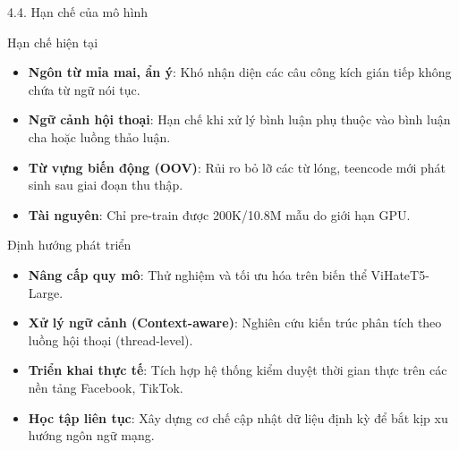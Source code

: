 \documentclass[11pt, aspectratio=169]{beamer}
\begin{document}
\begin{frame}[shrink=5]{4.4. Hạn chế của mô hình}
\scriptsize

\begin{block}{Hạn chế hiện tại}
  \begin{itemize}
    \item \textbf{Ngôn từ mỉa mai, ẩn ý}: Khó nhận diện các câu công kích gián tiếp không chứa từ ngữ nói tục.
    \item \textbf{Ngữ cảnh hội thoại}: Hạn chế khi xử lý bình luận phụ thuộc vào bình luận cha hoặc luồng thảo luận.
    \item \textbf{Từ vựng biến động (OOV)}: Rủi ro bỏ lỡ các từ lóng, teencode mới phát sinh sau giai đoạn thu thập.
    \item \textbf{Tài nguyên}: Chỉ pre-train được 200K/10.8M mẫu do giới hạn GPU.
  \end{itemize}
\end{block}

\vspace{0.3cm}
\begin{block}{Định hướng phát triển}
  \begin{itemize}
    \item \textbf{Nâng cấp quy mô}: Thử nghiệm và tối ưu hóa trên biến thể ViHateT5-Large.
    \item \textbf{Xử lý ngữ cảnh (Context-aware)}: Nghiên cứu kiến trúc phân tích theo luồng hội thoại (thread-level).
    \item \textbf{Triển khai thực tế}: Tích hợp hệ thống kiểm duyệt thời gian thực trên các nền tảng Facebook, TikTok.
    \item \textbf{Học tập liên tục}: Xây dựng cơ chế cập nhật dữ liệu định kỳ để bắt kịp xu hướng ngôn ngữ mạng.
  \end{itemize}
\end{block}
\end{frame}
\end{document}

